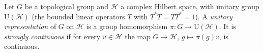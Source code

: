 Let $G$ be a topological group and $\mathcal H$ a complex Hilbert space, with unitary group
$\mathrm U(\mathcal H)$ (the bounded linear operators $T$ with $T^*T=TT^*=1$). A \emph{unitary representation} of $G$
on $\mathcal H$ is a group homomorphism $\pi\colon G\to\mathrm U(\mathcal H)$. It is \emph{strongly continuous} if for
every $v\in\mathcal H$ the map $G\to\mathcal H$, $g\mapsto\pi(g)v$, is continuous.
